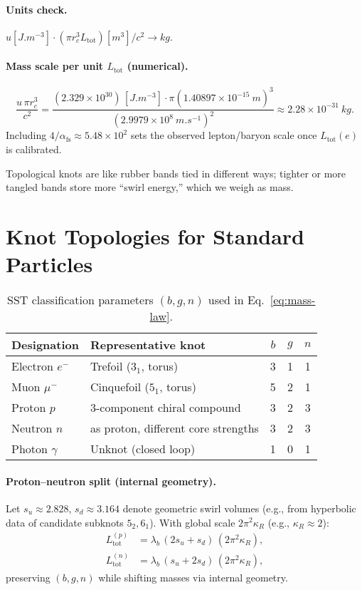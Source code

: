 \documentclass[10pt,reprint,aps,onecolumn,nofootinbib]{revtex4-2}
\newcommand{\rc}{r_c}
\begin{document}
\paragraph*{Units check.} \(u[\si{J.m^{-3}}]\cdot(\pi \rc^3 L_{\text{tot}})[\si{m^3}]/c^2\to \si{kg}\).
\paragraph*{Mass scale per unit \(L_{\text{tot}}\) (numerical).}
\[
\frac{u\,\pi\rc^3}{c^2}
=
\frac{(2.329\times 10^{30})\,[\si{J.m^{-3}}]\cdot \pi(1.40897\times 10^{-15}\ \si{m})^{3}}{(2.9979\times 10^{8}\ \si{m.s^{-1}})^{2}}
\approx 2.28\times 10^{-31}\ \si{kg}.
\]
Including \(4/\alpha_{\mathrm{fs}}\approx 5.48\times 10^{2}\) sets the observed lepton/baryon scale once \(L_{\text{tot}}(e)\) is calibrated.
    \begin{analogynote}
    Topological knots are like rubber bands tied in different ways; tighter or more tangled bands store more ``swirl energy,'' which we weigh as mass.
    \end{analogynote}


\section*{Knot Topologies for Standard Particles}
\begin{table}[h]
\centering
\begin{tabular}{@{}llccc@{}}
\toprule
Designation & Representative knot & \(b\) & \(g\) & \(n\) \\
\midrule
Electron \(e^-\) & Trefoil (\(3_1\), torus) & 3 & 1 & 1 \\
Muon \(\mu^-\) & Cinquefoil (\(5_1\), torus) & 5 & 2 & 1 \\
Proton \(p\) & 3-component chiral compound & 3 & 2 & 3 \\
Neutron \(n\) & as proton, different core strengths & 3 & 2 & 3 \\
Photon \(\gamma\) & Unknot (closed loop) & 1 & 0 & 1 \\
\bottomrule
\end{tabular}
\caption{SST classification parameters \((b,g,n)\) used in Eq.~\eqref{eq:mass-law}.}
\label{tab:sst-classes}
\end{table}

\paragraph*{Proton–neutron split (internal geometry).}
Let \(s_u\approx 2.828\), \(s_d\approx 3.164\) denote geometric swirl volumes (e.g., from hyperbolic data of candidate subknots \(5_2,6_1\)). With global scale \(2\pi^2\kappa_R\) (e.g., \(\kappa_R\!\approx\!2\)):
\begin{align*}
L_{\text{tot}}^{(p)} &= \lambda_b\,(2s_u+s_d)\,(2\pi^2\kappa_R),\\
L_{\text{tot}}^{(n)} &= \lambda_b\,(s_u+2s_d)\,(2\pi^2\kappa_R),
\end{align*}
preserving \((b,g,n)\) while shifting masses via internal geometry.
\end{document}
